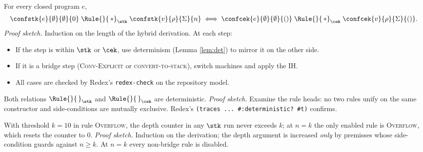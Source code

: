 
\begin{lemma}\label{lem:sem-eq}
For every closed program $e$,
\[
  \confstk{e}{\emptyset}{\emptyset}{0}
     \;\Rule{}{\,*}_{\stk}\;
  \confstk{v}{\rho}{\Sigma}{n}
  \;\Longleftrightarrow\;
  \confcek{e}{\emptyset}{\emptyset}{()}
     \;\Rule{}{\,*}_{\cek}\;
  \confcek{v}{\rho}{\Sigma}{()} .
\]
\textit{Proof sketch.}
Induction on the length of the hybrid derivation.  At each step:
\begin{itemize}\itemsep0pt
  \item If the step is within $\stk$ or $\cek$, use determinism
        (Lemma \ref{lem:det}) to mirror it on the other side.
  \item If it is a bridge step (\textsc{Conv-Explicit} or
        \textsc{convert-to-stack}), switch machines and apply the IH.
  \item All cases are checked by Redex’s \texttt{redex-check}
        on the repository model.
\end{itemize}
\end{lemma}

\begin{lemma}[Determinism]\label{lem:det}
Both relations $\Rule{}{\,}_{\stk}$ and $\Rule{}{\,}_{\cek}$ are deterministic.
\textit{Proof sketch.}
Examine the rule heads: no two rules unify on the same constructor and
side-conditions are mutually exclusive.  Redex’s
\texttt{(traces ... \#:deterministic? \#t)} confirms.
\end{lemma}

\begin{lemma}\label{lem:depth}
With threshold \(k=10\) in rule \textsc{Overflow},
the depth counter in any $\stk$ run never exceeds \(k\);
at \(n=k\) the only enabled rule is \textsc{Overflow}, which resets
the counter to \(0\).
\textit{Proof sketch.}
Induction on the derivation; the depth argument is increased
\emph{only} by premisses whose side-condition guards against
\(n\ge k\).  At \(n=k\) every non-bridge rule is disabled.
\end{lemma}

